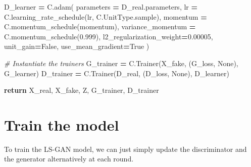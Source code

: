\documentclass[]{book}
\newenvironment{Shaded}{\begin{snugshade}}{\end{snugshade}}
\newcommand{\FloatTok}[1]{\textcolor[rgb]{0.00,0.00,0.81}{#1}}
\newcommand{\CommentTok}[1]{\textcolor[rgb]{0.56,0.35,0.01}{\textit{#1}}}
\newcommand{\VariableTok}[1]{\textcolor[rgb]{0.00,0.00,0.00}{#1}}
\newcommand{\ControlFlowTok}[1]{\textcolor[rgb]{0.13,0.29,0.53}{\textbf{#1}}}
\newcommand{\OperatorTok}[1]{\textcolor[rgb]{0.81,0.36,0.00}{\textbf{#1}}}
\newcommand{\NormalTok}[1]{#1}
\theoremstyle{definition}
\theoremstyle{definition}
\theoremstyle{definition}
\theoremstyle{remark}
\begin{document}
\begin{Shaded}
\begin{Highlighting}[]
\NormalTok{    D_learner }\OperatorTok{=}\NormalTok{ C.adam(}
\NormalTok{            parameters }\OperatorTok{=}\NormalTok{ D_real.parameters,}
\NormalTok{            lr }\OperatorTok{=}\NormalTok{ C.learning_rate_schedule(lr, C.UnitType.sample),}
\NormalTok{            momentum }\OperatorTok{=}\NormalTok{ C.momentum_schedule(momentum),}
\NormalTok{            variance_momentum }\OperatorTok{=}\NormalTok{ C.momentum_schedule(}\FloatTok{0.999}\NormalTok{),}
\NormalTok{            l2_regularization_weight}\OperatorTok{=}\FloatTok{0.00005}\NormalTok{,}
\NormalTok{            unit_gain}\OperatorTok{=}\VariableTok{False}\NormalTok{,}
\NormalTok{            use_mean_gradient}\OperatorTok{=}\VariableTok{True}
\NormalTok{        )}
    
    \CommentTok{# Instantiate the trainers}
\NormalTok{    G_trainer }\OperatorTok{=}\NormalTok{ C.Trainer(X_fake,}
\NormalTok{                        (G_loss, }\VariableTok{None}\NormalTok{),}
\NormalTok{                        G_learner)}
\NormalTok{    D_trainer }\OperatorTok{=}\NormalTok{ C.Trainer(D_real,}
\NormalTok{                        (D_loss, }\VariableTok{None}\NormalTok{),}
\NormalTok{                        D_learner)}

    \ControlFlowTok{return}\NormalTok{ X_real, X_fake, Z, G_trainer, D_trainer}
\end{Highlighting}
\end{Shaded}

\section{Train the model}\label{train-the-model-1}

To train the LS-GAN model, we can just simply update the discriminator
and the generator alternatively at each round.
\end{document}
